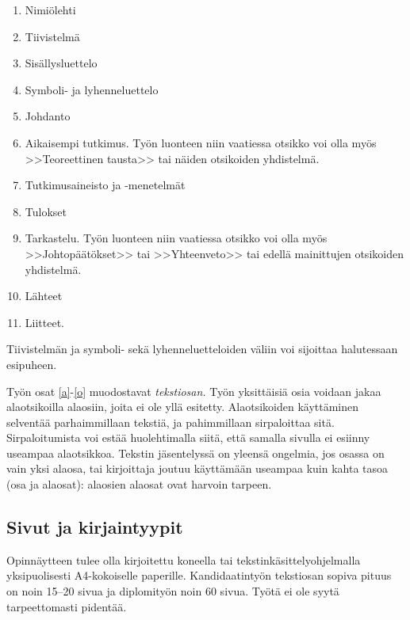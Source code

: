 \documentclass[english,12pt,a4paper,pdftex,sci,utf8]{aaltothesis}
\begin{document}
\begin{enumerate}
\item Nimi\"olehti
\item Tiivistelm\"a
\item Sis\"allysluettelo
\item Symboli- ja lyhenneluettelo
\item \label{a} Johdanto
\item  Aikaisempi tutkimus. Ty\"on luonteen niin vaatiessa otsikko voi olla my\"os
        >>Teoreettinen tausta>>  tai n\"aiden otsikoiden yhdistelm\"a.
\item Tutkimusaineisto ja -menetelm\"at %
\item Tulokset
\item \label{o} Tarkastelu. Ty\"on luonteen niin vaatiessa otsikko voi
      olla my\"os >>Johtop\"a\"at\"okset>> tai >>Yhteenveto>> 
      tai edell\"a mainittujen otsikoiden yhdistelm\"a.
\item L\"ahteet
\item Liitteet.
\end{enumerate}

Tiivistelm\"an ja symboli- sek\"a lyhenneluetteloiden 
v\"aliin voi sijoittaa halutessaan esipuheen.  

Ty\"on osat \ref{a}-\ref{o} muodostavat \textit{tekstiosan.}  Ty\"on
yksitt\"aisi\"a osia voidaan jakaa alaotsikoilla alaosiin, joita ei ole
yll\"a esitetty. Alaotsikoiden k\"aytt\"aminen selvent\"a\"a parhaimmillaan
teksti\"a, ja pahimmillaan sirpaloittaa sit\"a.  Sirpaloitumista voi est\"a\"a
huolehtimalla siit\"a, ett\"a samalla sivulla ei esiinny useampaa
alaotsikkoa.  Tekstin j\"asentelyss\"a on yleens\"a ongelmia, jos osassa on
vain yksi alaosa, tai kirjoittaja joutuu k\"aytt\"am\"a\"an useampaa kuin
kahta tasoa (osa ja alaosat): alaosien alaosat ovat harvoin tarpeen.
\subsection*{Sivut ja kirjaintyypit}

Opinn\"aytteen tulee olla kirjoitettu koneella tai
tekstink\"asittelyohjelmalla yksipuolisesti A4-kokoiselle paperille.
Kandidaatinty\"on tekstiosan sopiva pituus on noin 15--20 sivua ja
diplomity\"on noin 60 sivua. Ty\"ot\"a ei ole syyt\"a tarpeettomasti pident\"a\"a.
\end{document}
